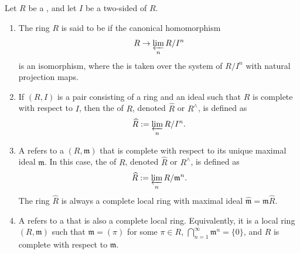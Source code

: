 \begin{definition}\label{definition:complete_ring_with_respect_to_an_ideal}
    Let $R$ be a , and let $I$ be a two-sided  of $R$.

    \begin{enumerate}
        \item The ring $R$ is said to be  if the canonical homomorphism
        $$
            R \to \varprojlim_{n} R/I^n
        $$
        is an isomorphism, where the  is taken over the system of  $R/I^n$ with natural projection maps.

        \item If $(R, I)$ is a pair consisting of a ring and an ideal such that $R$ is complete with respect to $I$, then the  of $R$, denoted $\widehat{R}$ or $R^\wedge$, is defined as
        $$
            \widehat{R} := \varprojlim_{n} R/I^n.
        $$

        \item A  refers to a  $(R, \mathfrak{m})$ that is complete with respect to its unique maximal ideal $\mathfrak{m}$. In this case, the  of $R$, denoted $\widehat{R}$ or $R^\wedge$, is defined as
        $$
            \widehat{R} := \varprojlim_{n} R/\mathfrak{m}^n.
        $$
        The ring $\widehat{R}$ is always a complete local ring with maximal ideal $\widehat{\mathfrak{m}} = \mathfrak{m}\widehat{R}$.

        \item A  refers to a  that is also a complete local ring. Equivalently, it is a local ring $(R, \mathfrak{m})$ such that $\mathfrak{m} = (\pi)$ for some $\pi \in R$, $\bigcap_{n=1}^\infty \mathfrak{m}^n = \{0\}$, and $R$ is complete with respect to $\mathfrak{m}$.
    \end{enumerate}
\end{definition}
